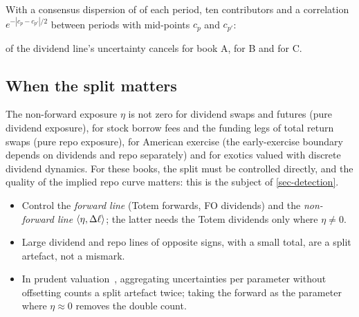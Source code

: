 \begin{example}[Materiality]\label{ex-materiality}
With a consensus dispersion of  of each period, ten contributors and a correlation $e^{-|c_p-c_{p'}|/2}$ between
periods with mid-points $c_p$ and $c_{p'}$:
\begin{center}\end{center}
\vMatA{} of the dividend line's uncertainty cancels for book A, \vMatB{} for B and \vMatC{} for C.
\end{example}

\subsection{When the split matters}
The non-forward exposure $\eta$ is not zero for dividend swaps and futures (pure dividend exposure), for stock borrow
fees and the funding legs of total return swaps (pure repo exposure), for American exercise (the early-exercise
boundary depends on dividends and repo separately) and for exotics valued with discrete dividend dynamics. For these
books, the split must be controlled directly, and the quality of the implied repo curve matters: this is the subject
of \cref{sec-detection}.

\begin{retenir}
\begin{itemize}[leftmargin=12pt]
\item Control the \emph{forward line} (Totem forwards, FO dividends) and the \emph{non-forward line}
$\langle \eta, \Delta\ell\rangle$; the latter needs the Totem dividends only where $\eta\ne0$.
\item Large dividend and repo lines of opposite signs, with a small total, are a split artefact, not a mismark.
\item In prudent valuation~\cite{eu2016}, aggregating uncertainties per parameter without offsetting counts a split
artefact twice; taking the forward as the parameter where $\eta\approx0$ removes the double count.
\end{itemize}
\end{retenir}
